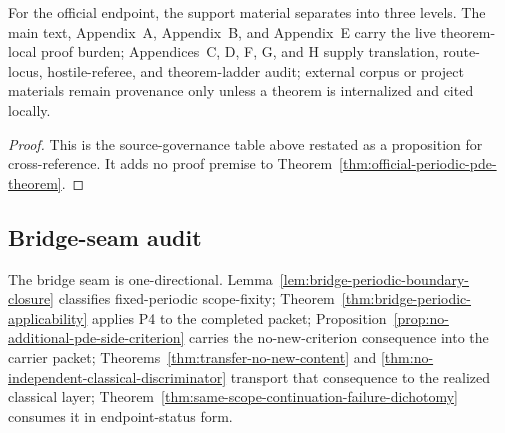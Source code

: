 \begin{proposition}\label{prop:three-level-support-ledger}
For the official endpoint, the support material separates into three levels. The main text, Appendix~A, Appendix~B, and Appendix~E carry the live theorem-local proof burden; Appendices~C, D, F, G, and H supply translation, route-locus, hostile-referee, and theorem-ladder audit; external corpus or project materials remain provenance only unless a theorem is internalized and cited locally.
\end{proposition}
\begin{proof}
This is the source-governance table above restated as a proposition for cross-reference. It adds no proof premise to Theorem~\ref{thm:official-periodic-pde-theorem}.
\end{proof}

\subsection{Bridge-seam audit}\label{sec:bridge-seam-audit-modernized}
The bridge seam is one-directional. Lemma~\ref{lem:bridge-periodic-boundary-closure} classifies fixed-periodic scope-fixity; Theorem~\ref{thm:bridge-periodic-applicability} applies P4 to the completed packet; Proposition~\ref{prop:no-additional-pde-side-criterion} carries the no-new-criterion consequence into the carrier packet; Theorems~\ref{thm:transfer-no-new-content} and \ref{thm:no-independent-classical-discriminator} transport that consequence to the realized classical layer; Theorem~\ref{thm:same-scope-continuation-failure-dichotomy} consumes it in endpoint-status form.

